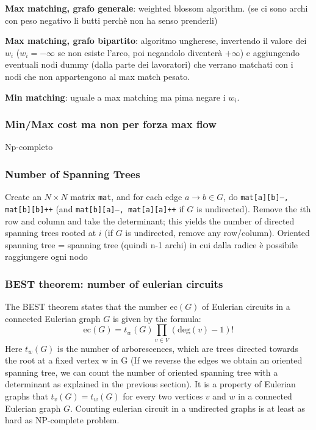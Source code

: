 \textbf{Max matching, grafo generale}: weighted blossom algorithm. (se ci sono archi con peso negativo li butti perchè non ha senso prenderli)

\textbf{Max matching, grafo bipartito}: algoritmo ungherese, invertendo il valore dei $w_i$ ($w_i=-\infty$ se non esiste l'arco, poi negandolo diventerà $+\infty$) e aggiungendo eventuali nodi dummy (dalla parte dei lavoratori) che verrano matchati con i nodi che non appartengono al max match pesato.

\textbf{Min matching}: uguale a max matching ma pima negare i $w_i$.


\subsubsection{Min/Max cost ma non per forza max flow}
Np-completo

\subsubsection{Number of Spanning Trees}
		Create an $N\times N$ matrix \texttt{mat}, and for each edge $a \rightarrow b \in G$, do
		\texttt{mat[a][b]--, mat[b][b]++} (and \texttt{mat[b][a]--, mat[a][a]++} if $G$ is undirected).
		Remove the $i$th row and column and take the determinant; this yields the number of directed spanning trees rooted at $i$
		(if $G$ is undirected, remove any row/column). Oriented spanning tree = spanning tree (quindi n-1 archi) in cui dalla radice è possibile raggiungere ogni nodo

\subsubsection{BEST theorem: number of eulerian circuits}
The BEST theorem states that the number ec$(G)$ of Eulerian circuits in a connected Eulerian graph $G$ is given by the formula:
$$\text{ec}(G)=t_w(G)\prod_{v\in V}(\text{deg}(v)-1)!$$
Here $t_w(G)$ is the number of arborescences, which are trees directed towards the root at a fixed vertex w in G (If we reverse the edges we obtain an oriented spanning tree, we can count the number of oriented spanning tree with a determinant as explained in the previous section).
It is a property of Eulerian graphs that $t_v(G) = t_w(G)$ for every two vertices $v$ and $w$ in a connected Eulerian graph $G$. Counting eulerian circuit in a undirected graphs is at least as hard as NP-complete problem.

\,
